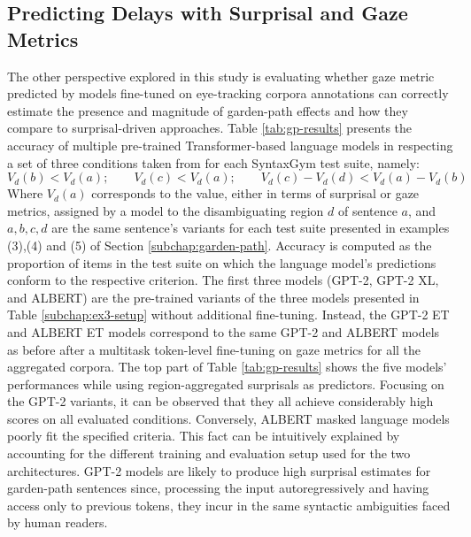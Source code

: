 \documentclass[a4paper, nobind]{templates/ociamthesis}
\begin{document}
\hypertarget{subsubchap:ex3-predicting}{%
\subsection{Predicting Delays with Surprisal and Gaze Metrics}\label{subsubchap:ex3-predicting}}

The other perspective explored in this study is evaluating whether gaze metric predicted by models fine-tuned on eye-tracking corpora annotations can correctly estimate the presence and magnitude of garden-path effects and how they compare to surprisal-driven approaches. Table \ref{tab:gp-results} presents the accuracy of multiple pre-trained Transformer-based language models in respecting a set of three conditions taken from \textcite{hu-etal-2020-systematic} for each SyntaxGym test suite, namely:
\begin{equation}
V_d(b) < V_d(a);\qquad V_d(c) < V_d(a);\qquad V_d(c)-V_d(d) < V_d(a)-V_d(b)
\end{equation}
Where \(V_d(a)\) corresponds to the value, either in terms of surprisal or gaze metrics, assigned by a model to the disambiguating region \(d\) of sentence \(a\), and \(a,b,c,d\) are the same sentence's variants for each test suite presented in examples (3),(4) and (5) of Section \ref{subchap:garden-path}. Accuracy is computed as the proportion of items in the test suite on which the language model's predictions conform to the respective criterion. The first three models (GPT-2, GPT-2 XL, and ALBERT) are the pre-trained variants of the three models presented in Table \ref{subchap:ex3-setup} without additional fine-tuning. Instead, the GPT-2 ET and ALBERT ET models correspond to the same GPT-2 and ALBERT models as before after a multitask token-level fine-tuning on gaze metrics for all the aggregated corpora. The top part of Table \ref{tab:gp-results} shows the five models' performances while using region-aggregated surprisals as predictors. Focusing on the GPT-2 variants, it can be observed that they all achieve considerably high scores on all evaluated conditions. Conversely, ALBERT masked language models poorly fit the specified criteria. This fact can be intuitively explained by accounting for the different training and evaluation setup used for the two architectures. GPT-2 models are likely to produce high surprisal estimates for garden-path sentences since, processing the input autoregressively and having access only to previous tokens, they incur in the same syntactic ambiguities faced by human readers.
\end{document}
